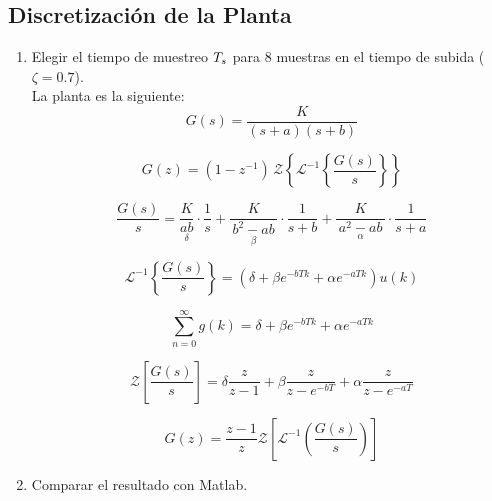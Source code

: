 \subsection{Discretización de la Planta}
\begin{enumerate}[label=2.\arabic*.]
	\item Elegir el tiempo de muestreo $T_s$ para 8 muestras en el tiempo de subida ($\zeta = 0.7$). \\
	La planta es la siguiente:
	\begin{equation}
		G(s) = \frac{K}{(s+a)(s+b)}
	\end{equation}
	
	\begin{equation}
		G(z)=(1 - z^{-1})\,\mathcal{Z}\left\{ \mathcal{L}^{-1}\left\{ \frac{G(s)}{s} \right\} \right\}
	\end{equation}
	
	\begin{equation}
		\frac{G(s)}{s} =
		\underset{\delta}{\frac{K}{ab}} \cdot \frac{1}{s}
		+ \underset{\beta}{\frac{K}{\,b^2-ab\,}} \cdot \frac{1}{s+b}
		+ \underset{\alpha}{\frac{K}{\,a^2-ab\,}} \cdot \frac{1}{s+a}
	\end{equation}
	
	\begin{equation}
		\mathcal{L}^{-1} \left\{\frac{G(s)}{s}\right\}=\left(\delta + \beta e^{-bTk}+\alpha e^{-aTk}\right) u(k)
	\end{equation}
	
	\begin{equation}
		\sum_{n=0}^{\infty}g(k) = \delta + \beta e^{-bTk}+\alpha e^{-aTk}
	\end{equation}
	
	\begin{equation}
		\mathcal{Z}\left[\frac{G(s)}{s}\right] = \delta \frac{z}{z-1}+\beta \frac{z}{z-e^{-bT}}+\alpha \frac{z}{z-e^{-aT}}
	\end{equation}
	
	\begin{equation}
		G(z) = \frac{z-1}{z} \mathcal{Z}\left[\mathcal{L}^{-1}\left(\frac{G(s)}{s}\right)\right]
	\end{equation}
	
	\item Comparar el resultado con Matlab.
\end{enumerate}
